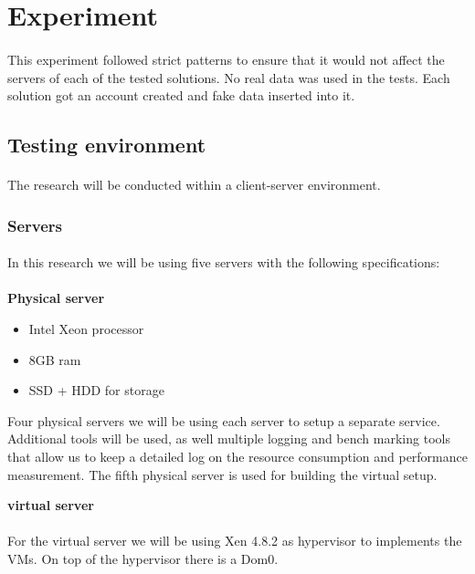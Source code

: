 \section{Experiment}
\paragraph{}
This experiment followed strict patterns to ensure that it would not affect the servers of each of the tested solutions. No real data was used in the tests. Each solution got an account created and fake data inserted into it.


\subsection{Testing environment}
\paragraph{}
The research will be conducted within a client-server environment.

\subsubsection{Servers}
\paragraph{}
In this research we will be using five servers with the following specifications:\\~\\
\textbf{Physical server}
\begin{itemize}
	\item Intel Xeon processor
	\item 8GB ram
	\item SSD + HDD for storage
\end{itemize}

 Four physical servers we will be using each server to setup a separate service. Additional tools will be used, as well multiple logging and bench marking tools that allow us to keep a detailed log on the resource consumption and performance measurement. The fifth physical server is used for building the virtual setup.
 
\textbf{virtual server}
\paragraph{}
For the virtual server we will be using Xen 4.8.2 as hypervisor to implements the VMs. On top of the hypervisor there is a Dom0.

